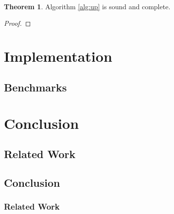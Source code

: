 \documentclass{vutinfth} %
\theoremstyle{example}
\theoremstyle{definition}
\theoremstyle{theorem}
\newtheorem{theorem}{Theorem}[section]
\theoremstyle{lemma}
\theoremstyle{corollary}
\begin{document}
\begin{theorem}
Algorithm \ref{alg:up} is sound and complete.
\end{theorem}

\begin{proof}

\end{proof}

\chapter{Implementation}

\section{Benchmarks}

\chapter{Conclusion}

\section{Related Work}

\section{Conclusion}

\subsection{Related Work}

\backmatter

\listoffigures %

\listoftables %

\listofalgorithms
{}

\printindex

\printglossaries



\end{document}
